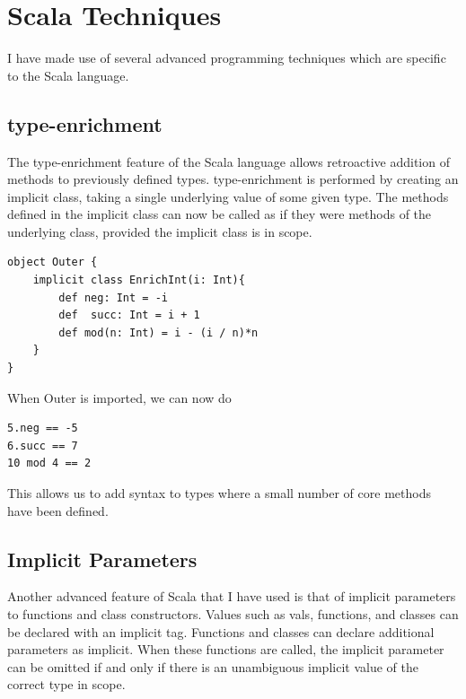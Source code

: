 \documentclass[12pt,a4paper,twoside,openright]{report}
\renewcommand{\baselinestretch}{1.1}    %
\begin{document}
\section{Scala Techniques}
I have made use of several advanced programming techniques which are specific to the Scala language.

\subsection{type-enrichment}
The type-enrichment feature of the Scala language allows retroactive addition of methods to previously defined types. type-enrichment is performed by creating an implicit class, taking a single underlying value of some given type. The methods defined in the implicit class can now be called as if they were methods of the underlying class, provided the implicit class is in scope.

\renewcommand{\baselinestretch}{0.8}
\begin{framed}
\begin{framed}
\begin{verbatim}
object Outer {
    implicit class EnrichInt(i: Int){
        def neg: Int = -i
        def  succ: Int = i + 1
        def mod(n: Int) = i - (i / n)*n
    }
}
\end{verbatim}
\end{framed}
\renewcommand{\baselinestretch}{1.1}
When Outer is imported, we can now do

\renewcommand{\baselinestretch}{0.8}
\begin{framed}
\begin{verbatim}
5.neg == -5
6.succ == 7
10 mod 4 == 2
\end{verbatim}
\end{framed}
\end{framed}
\renewcommand{\baselinestretch}{1.1}






This allows us to add syntax to types where a small number of core methods have been defined.

\subsection{Implicit Parameters}
Another advanced feature of Scala that  I have used is that of implicit  parameters to functions and class constructors. Values such as vals, functions, and classes can be declared with an implicit tag. Functions and classes can declare additional parameters as implicit. When these functions are called, the implicit parameter can be omitted if and only if there is an unambiguous implicit value of the correct type in scope.
\end{document}
